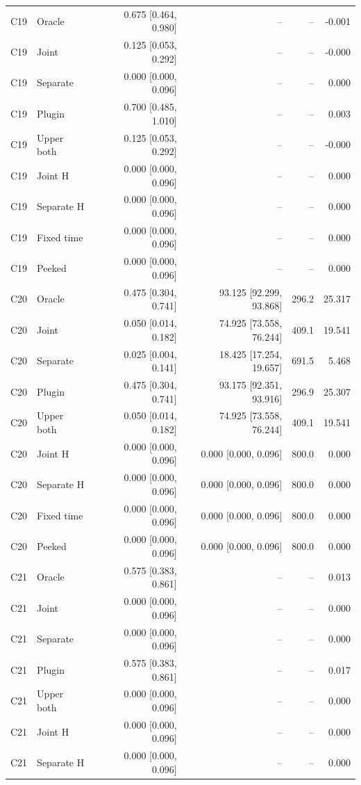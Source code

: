 \begin{longtable}{llrrrr}
C19 & Oracle & 0.675 [0.464, 0.980] & -- & -- & -0.001\\
C19 & Joint & 0.125 [0.053, 0.292] & -- & -- & -0.000\\
C19 & Separate & 0.000 [0.000, 0.096] & -- & -- & 0.000\\
C19 & Plugin & 0.700 [0.485, 1.010] & -- & -- & 0.003\\
C19 & Upper both & 0.125 [0.053, 0.292] & -- & -- & -0.000\\
C19 & Joint H & 0.000 [0.000, 0.096] & -- & -- & 0.000\\
C19 & Separate H & 0.000 [0.000, 0.096] & -- & -- & 0.000\\
C19 & Fixed time & 0.000 [0.000, 0.096] & -- & -- & 0.000\\
C19 & Peeked & 0.000 [0.000, 0.096] & -- & -- & 0.000\\
C20 & Oracle & 0.475 [0.304, 0.741] & 93.125 [92.299, 93.868] & 296.2 & 25.317\\
C20 & Joint & 0.050 [0.014, 0.182] & 74.925 [73.558, 76.244] & 409.1 & 19.541\\
C20 & Separate & 0.025 [0.004, 0.141] & 18.425 [17.254, 19.657] & 691.5 & 5.468\\
C20 & Plugin & 0.475 [0.304, 0.741] & 93.175 [92.351, 93.916] & 296.9 & 25.307\\
C20 & Upper both & 0.050 [0.014, 0.182] & 74.925 [73.558, 76.244] & 409.1 & 19.541\\
C20 & Joint H & 0.000 [0.000, 0.096] & 0.000 [0.000, 0.096] & 800.0 & 0.000\\
C20 & Separate H & 0.000 [0.000, 0.096] & 0.000 [0.000, 0.096] & 800.0 & 0.000\\
C20 & Fixed time & 0.000 [0.000, 0.096] & 0.000 [0.000, 0.096] & 800.0 & 0.000\\
C20 & Peeked & 0.000 [0.000, 0.096] & 0.000 [0.000, 0.096] & 800.0 & 0.000\\
C21 & Oracle & 0.575 [0.383, 0.861] & -- & -- & 0.013\\
C21 & Joint & 0.000 [0.000, 0.096] & -- & -- & 0.000\\
C21 & Separate & 0.000 [0.000, 0.096] & -- & -- & 0.000\\
C21 & Plugin & 0.575 [0.383, 0.861] & -- & -- & 0.017\\
C21 & Upper both & 0.000 [0.000, 0.096] & -- & -- & 0.000\\
C21 & Joint H & 0.000 [0.000, 0.096] & -- & -- & 0.000\\
C21 & Separate H & 0.000 [0.000, 0.096] & -- & -- & 0.000\\

\end{longtable}
